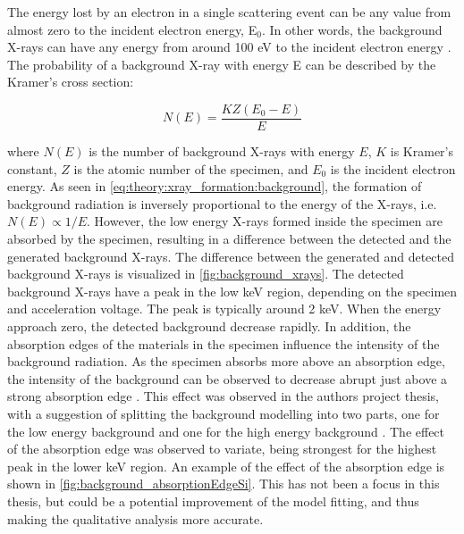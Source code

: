 The energy lost by an electron in a single scattering event can be any value from almost zero to the incident electron energy, E$_0$.
In other words, the background X-rays can have any energy from around 100 eV to the incident electron energy \cite[Ch. 4.3]{goldstein_scanning_2018}.
The probability of a background X-ray with energy E can be described by the Kramer's cross section:

\begin{equation}
    \label{eq:theory:xray_formation:background}
    N(E) = \frac{K Z (E_0-E)}{E}
\end{equation}

where $N(E)$ is the number of background X-rays with energy $E$, $K$ is Kramer's constant, $Z$ is the atomic number of the specimen, and $E_0$ is the incident electron energy.
As seen in \cref{eq:theory:xray_formation:background}, the formation of background radiation is inversely proportional to the energy of the X-rays, i.e. $N(E) \propto 1/E$.
However, the low energy X-rays formed inside the specimen are absorbed by the specimen, resulting in a difference between the detected and the generated background X-rays.
The difference between the generated and detected background X-rays is visualized in \cref{fig:background_xrays}.
The detected background X-rays have a peak in the low keV region, depending on the specimen and acceleration voltage.
The peak is typically around 2 keV.
When the energy approach zero, the detected background decrease rapidly.
In addition, the absorption edges of the materials in the specimen influence the intensity of the background radiation.
As the specimen absorbs more above an absorption edge, the intensity of the background can be observed to decrease abrupt just above a strong absorption edge \cite[p. 59]{goldstein_scanning_2018}.
This effect was observed in the authors project thesis, with a suggestion of splitting the background modelling into two parts, one for the low energy background and one for the high energy background \cite{project_report}.
The effect of the absorption edge was observed to variate, being strongest for the highest peak in the lower keV region.
An example of the effect of the absorption edge is shown in \cref{fig:background_absorptionEdgeSi}.
This has not been a focus in this thesis, but could be a potential improvement of the model fitting, and thus making the qualitative analysis more accurate.


